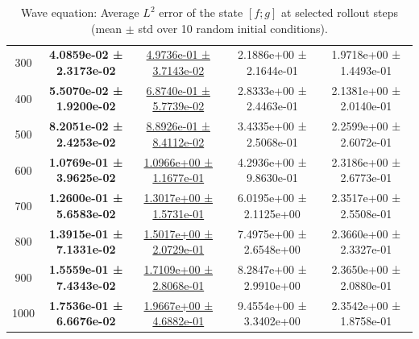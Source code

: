 \documentclass{article}
\theoremstyle{plain}
\theoremstyle{definition}
\theoremstyle{remark}
\begin{document}
\begin{table}[htbp]
\begin{tabular}{ccccc}
300 & \textbf{4.0859e-02 ± 2.3173e-02} & \underline{4.9736e-01 ± 3.7143e-02} & 2.1886e+00 ± 2.1644e-01 & 1.9718e+00 ± 1.4493e-01 \\
400 & \textbf{5.5070e-02 ± 1.9200e-02} & \underline{6.8740e-01 ± 5.7739e-02} & 2.8333e+00 ± 2.4463e-01 & 2.1381e+00 ± 2.0140e-01 \\
500 & \textbf{8.2051e-02 ± 2.4253e-02} & \underline{8.8926e-01 ± 8.4112e-02} & 3.4335e+00 ± 2.5068e-01 & 2.2599e+00 ± 2.6072e-01 \\
600 & \textbf{1.0769e-01 ± 3.9625e-02} & \underline{1.0966e+00 ± 1.1677e-01} & 4.2936e+00 ± 9.8630e-01 & 2.3186e+00 ± 2.6773e-01 \\
700 & \textbf{1.2600e-01 ± 5.6583e-02} & \underline{1.3017e+00 ± 1.5731e-01} & 6.0195e+00 ± 2.1125e+00 & 2.3517e+00 ± 2.5508e-01 \\
800 & \textbf{1.3915e-01 ± 7.1331e-02} & \underline{1.5017e+00 ± 2.0729e-01} & 7.4975e+00 ± 2.6548e+00 & 2.3660e+00 ± 2.3327e-01 \\
900 & \textbf{1.5559e-01 ± 7.4343e-02} & \underline{1.7109e+00 ± 2.8068e-01} & 8.2847e+00 ± 2.9910e+00 & 2.3650e+00 ± 2.0880e-01 \\
1000& \textbf{1.7536e-01 ± 6.6676e-02} & \underline{1.9667e+00 ± 4.6882e-01} & 9.4554e+00 ± 3.3402e+00 & 2.3542e+00 ± 1.8758e-01 \\
\hline
\end{tabular}
\caption{Wave equation: Average $L^2$ error of the state $[f;g]$ at selected rollout steps (mean $\pm$ std over 10 random initial conditions).}
\label{tab:sm-avg_errors_time_rows}
\end{table}
\end{document}
